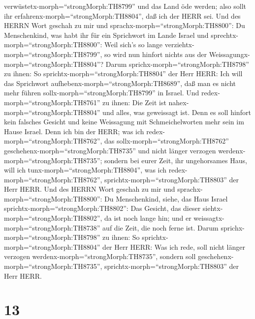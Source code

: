 verwüstetx-morph=``strongMorph:TH8799'' und das Land öde werden; also
sollt ihr erfahrenx-morph=``strongMorph:TH8804'', daß ich der HERR sei.
 Und des HERRN Wort geschah zu mir und
sprachx-morph=``strongMorph:TH8800'':  Du Menschenkind, was
habt ihr für ein Sprichwort im Lande Israel und
sprechtx-morph=``strongMorph:TH8800'': Weil sich's so lange
verziehtx-morph=``strongMorph:TH8799'', so wird nun hinfort nichts aus
der Weissagungx-morph=``strongMorph:TH8804''?  Darum
sprichx-morph=``strongMorph:TH8798'' zu ihnen: So
sprichtx-morph=``strongMorph:TH8804'' der Herr HERR: Ich will das
Sprichwort aufhebenx-morph=``strongMorph:TH8689'', daß man es nicht mehr
führen sollx-morph=``strongMorph:TH8799'' in Israel. Und
redex-morph=``strongMorph:TH8761'' zu ihnen: Die Zeit ist
nahex-morph=``strongMorph:TH8804'' und alles, was geweissagt ist.
 Denn es soll hinfort kein falsches Gesicht und keine
Weissagung mit Schmeichelworten mehr sein im Hause Israel. 
Denn ich bin der HERR; was ich redex-morph=``strongMorph:TH8762'', das
sollx-morph=``strongMorph:TH8762''
geschehenx-morph=``strongMorph:TH8735'' und nicht länger verzogen
werdenx-morph=``strongMorph:TH8735''; sondern bei eurer Zeit, ihr
ungehorsames Haus, will ich tunx-morph=``strongMorph:TH8804'', was ich
redex-morph=``strongMorph:TH8762'',
sprichtx-morph=``strongMorph:TH8803'' der Herr HERR.  Und
des HERRN Wort geschah zu mir und sprachx-morph=``strongMorph:TH8800'':
 Du Menschenkind, siehe, das Haus Israel
sprichtx-morph=``strongMorph:TH8802'': Das Gesicht, das dieser
siehtx-morph=``strongMorph:TH8802'', da ist noch lange hin; und er
weissagtx-morph=``strongMorph:TH8738'' auf die Zeit, die noch ferne ist.
 Darum sprichx-morph=``strongMorph:TH8798'' zu ihnen: So
sprichtx-morph=``strongMorph:TH8804'' der Herr HERR: Was ich rede, soll
nicht länger verzogen werdenx-morph=``strongMorph:TH8735'', sondern soll
geschehenx-morph=``strongMorph:TH8735'',
sprichtx-morph=``strongMorph:TH8803'' der Herr HERR.

\hypertarget{section-12}{%
\section{13}\label{section-12}}

